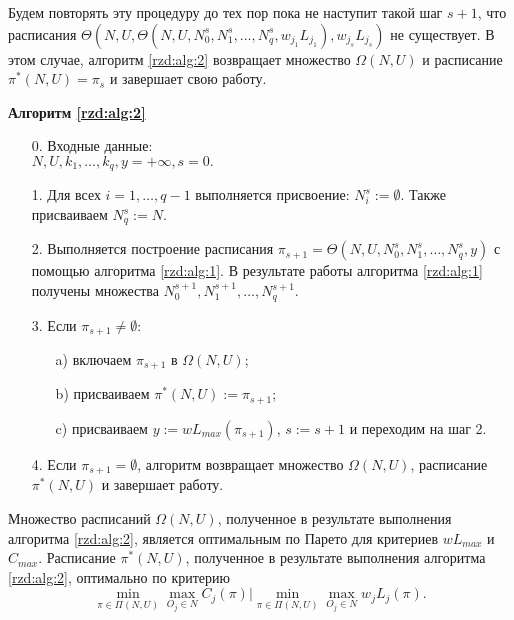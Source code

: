 Будем повторять эту процедуру до тех пор пока не наступит такой шаг $s+1$, что расписания $\Theta(N,U,\Theta(N,U,N_0^{s}, N_1^{s}, \dots, N_q^{s}, w_{j_1} L_{j_1}), w_{j_s} L_{j_s})$ не существует. В этом случае, алгоритм \ref{rzd:alg:2} возвращает множество $\Omega(N,U)$ и расписание $\pi^{*}(N,U) = \pi_s$ и завершает свою работу.

\begin{algorithm}[H]\label{rzd:alg:2}
\NoCaptionOfAlgo
\caption{\textbf{Алгоритм \ref{rzd:alg:2}}}
\begin{itemize}
\item[0.] Входные данные:\\
$N, U, k_1, \dots, k_q, y = +\infty, s=0.$
\item[1.] Для всех $i=1, \dots, q-1$ выполняется присвоение: $N^s_i := \emptyset.$ Также присваиваем $N^s_q := N$.
\item[2.] Выполняется построение расписания $\pi_{s+1} = \Theta(N,U,N_0^s, N_1^s, \dots, N_q^s,y)$ с помощью алгоритма \ref{rzd:alg:1}. В результате работы алгоритма \ref{rzd:alg:1} получены множества $N_0^{s+1}, N_1^{s+1}, \dots, N_q^{s+1}.$
\item[3.] Если $\pi_{s+1} \neq \emptyset:$
    \begin{itemize}
    \item[a)] включаем $\pi_{s+1}$ в $\Omega(N,U)$;
    \item[b)] присваиваем $\pi^{*}(N,U) := \pi_{s+1}$;
    \item[c)] присваиваем $y := wL_{max}(\pi_{s+1})$, $s:=s+1$ и переходим на шаг 2.
    \end{itemize}
\item[4.] Если $\pi_{s+1} = \emptyset$, алгоритм возвращает множество $\Omega(N,U)$, расписание $\pi^{*}(N,U)$ и завершает работу.
\end{itemize}
\end{algorithm}

\begin{theorem}\label{rzd:th:2}
Множество расписаний $\Omega(N,U)$, полученное в результате выполнения алгоритма \ref{rzd:alg:2}, является оптимальным по Парето для критериев $wL_{max}$ и $C_{max}$.
Расписание $\pi^{*}(N,U)$, полученное в результате выполнения алгоритма \ref{rzd:alg:2}, оптимально по критерию
$$ \min\limits_{\pi \in \Pi(N,U)} \max\limits_{O_j\in N} C_j(\pi) | \min\limits_{\pi \in \Pi(N,U)}\max\limits_{O_j\in N} w_j L_j(\pi).$$
\end{theorem}

